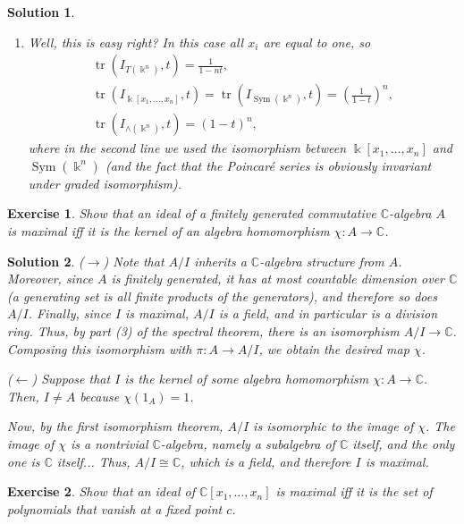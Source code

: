\documentclass{article}
\newtheorem{ex}{Exercise}
\theoremstyle{nonumberplain}
\newtheorem{sol}{Solution}
\newcommand{\C}{\mathbb{C}}
\newcommand{\kk}{\Bbbk}
\DeclareMathOperator{\trace}{tr}
\DeclareMathOperator{\Sym}{Sym}
\begin{document}
\begin{sol}
\begin{enumerate}
This concludes the first part.

\item Well, this is easy right? In this case all $x_i$ are equal to one, so
\begin{equation}
\begin{gathered}
\trace(I_{T(\kk^n)}, t) = \frac1{1-n t},\\
\trace(I_{\kk[x_1, \dots, x_n]}, t) = \trace(I_{\Sym(\kk^n)}, t) = \left(\frac1{1-t}\right)^n,\\
\trace(I_{\wedge(\kk^n)}, t) = (1-t)^n,
\end{gathered}
\end{equation}
where in the second line we used the isomorphism between $\kk[x_1, \dots, x_n]$ and $\Sym(\kk^n)$ (and the fact that the Poincaré series is obviously invariant under graded isomorphism).
\end{enumerate}
\end{sol}

\setcounter{ex}{5}

\begin{ex}
Show that an ideal of a finitely generated commutative $\C$-algebra $A$ is maximal iff it is the kernel of an algebra homomorphism $\chi \colon A \to \C$.
\end{ex}

\begin{sol}
($\rightarrow$) Note that $A/I$ inherits a $\C$-algebra structure from $A$. Moreover, since $A$ is finitely generated, it has at most countable dimension over $\C$ (a generating set is all finite products of the generators), and therefore so does $A/I$. Finally, since $I$ is maximal, $A/I$ is a field, and in particular is a division ring. Thus, by part (3) of the spectral theorem, there is an isomorphism $A/I \to \C$. Composing this isomorphism with $\pi \colon A \to A/I$, we obtain the desired map $\chi$.

\medskip

($\leftarrow$) Suppose that $I$ is the kernel of some algebra homomorphism $\chi \colon A \to \C$. Then, $I \neq A$ because $\chi(1_A) = 1$.

Now, by the first isomorphism theorem, $A/I$ is isomorphic to the image of $\chi$. The image of $\chi$ is a nontrivial $\C$-algebra, namely a subalgebra of $\C$ itself, and the only one is $\C$ itself... Thus, $A/I \cong \C$, which is a field, and therefore $I$ is maximal.
\end{sol}

\begin{ex}
Show that an ideal of $\C[x_1, \dots, x_n]$ is maximal iff it is the set of polynomials that vanish at a fixed point $c$.
\end{ex}
\end{document}
